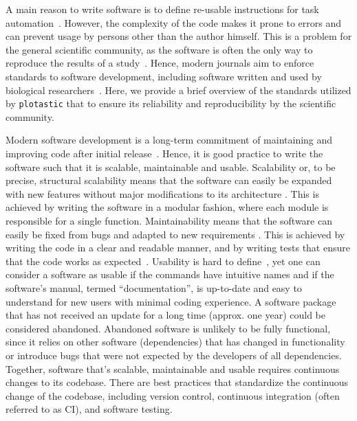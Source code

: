 




A main reason to write software is to define re-usable instructions for task
automation~\cite{narztReusabilityConceptProcess1998}. However, the complexity of
the code makes it prone to errors and can prevent usage by persons other than
the author himself. This is a problem for the general scientific community, as
the software is often the only way to reproduce the results of a
study~\cite{sandveTenSimpleRules2013}. Hence, modern journals aim to enforce
standards to software development, including software written and used by
biological researchers~\cite{smithJournalOpenSource2018}. Here, we provide a
brief overview of the standards utilized by \texttt{plotastic} that to ensure
its reliability and reproducibility by the scientific community.

Modern software development is a long-term commitment of maintaining and
improving code after initial release~\cite{boswellArtReadableCode2011}. Hence,
it is good practice to write the software such that it is scalable, maintainable
and usable. Scalability or, to be precise, structural scalability means that the
software can easily be expanded with new features without major modifications to
its architecture \cite{bondiCharacteristicsScalabilityTheir2000}. This is
achieved by writing the software in a modular fashion, where each module is
responsible for a single function. Maintainability means that the software can
easily be fixed from bugs and adapted to new requirements
\cite{kazmanMaintainability2020}. This is achieved by writing the code in a
clear and readable manner, and by writing tests that ensure that the code works
as expected~\cite{boswellArtReadableCode2011}. Usability is hard to
define~\cite{brookeSUSQuickDirty1996}, yet one can consider a software as usable
if the commands have intuitive names and if the software's manual, termed
``documentation'', is up-to-date and easy to understand for new users with
minimal coding experience. A software package that has not received an update
for a long time (approx. one year) could be considered abandoned. Abandoned
software is unlikely to be fully functional, since it relies on other software
(dependencies) that has changed in functionality or introduce bugs that were not
expected by the developers of all dependencies. Together, software that's
scalable, maintainable and usable requires continuous changes to its codebase.
There are best practices that standardize the continuous change of the codebase,
including version control, continuous integration (often referred to as CI), and
software testing.

